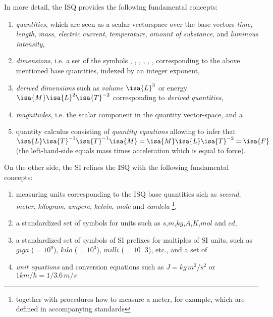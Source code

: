 \documentclass[11pt,a4paper]{book}
\begin{document}
In more detail, the ISQ provides the following fundamental concepts:
%
\begin{enumerate}%
\item \emph{quantities}, which are seen as a scalar vectorspace over the base vectors
      \emph{time}, \emph{length}, \emph{mass}, \emph{electric current},
      \emph{temperature}, \emph{amount of substance}, and \emph{luminous intensity},
 
\item \emph{dimensions}, i.e. a set of the symbols  , , , ,  
      \isa{{\isasymTheta}}, ,   corresponding to the above mentioned base 
      quantities, indexed by an integer exponent,

\item \emph{derived dimensions} such as \emph{volume} $\isa{L}^3$ or energy 
      $\isa{M}\isa{L}^2\isa{T}^{-2}$ corresponding to \emph{derived quantities}, 

\item \emph{magnitudes}, i.e. the scalar component in the quantity vector-space, and a

\item{quantity calculus} consisting of \emph{quantity equations} allowing to infer that 
      $\isa{L}\isa{T}^{-1}\isa{T}^{-1}\isa{M} = \isa{M}\isa{L}\isa{T}^{-2} = \isa{F} $ 
      (the left-hand-side equals mass times acceleration which is equal to force). 
\end{enumerate}

On the other side, the SI refines the ISQ with the following fundamental concepts:
\begin{enumerate}%
\item measuring units corresponding to the ISQ base quantities sich
      as \emph{second}, \emph{meter}, \emph{kilogram}, \emph{ampere}, \emph{kelvin}, \emph{mole} and
      \emph{candela} \footnote{together with procedures how to measure a meter, for example, which are
      defined in accompanying standards},
\item a standardized set of symbols for units such as $s$,$m$,$kg$,$A$,$K$,$mol$ and $cd$,
\item a standardized set of symbols of SI prefixes for multiples of SI units, such as 
      $giga$ ($=10^9$), $kilo$ ($=10^3$), $milli$ ($=10^-3$), etc., and a set of
\item \emph{unit equations} and conversion equations such as $J = kg\,m^2/s^2$ or $1 km/h = 1/3.6\,m/s$

\end{enumerate}
\end{document}
